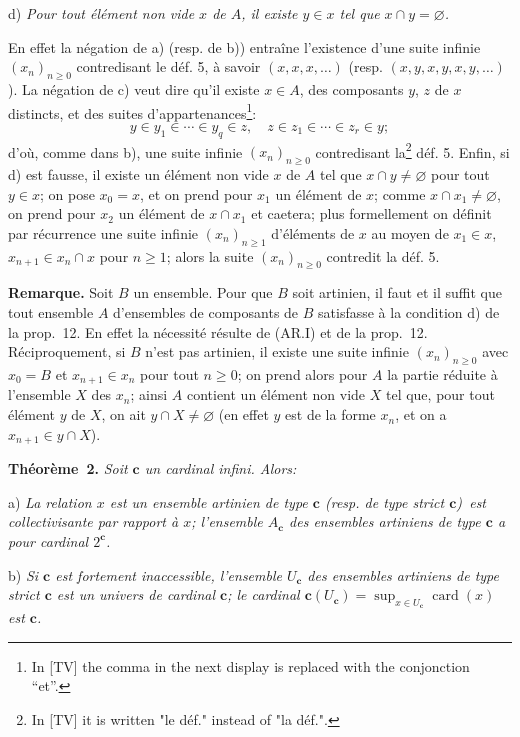 \documentclass[12pt]{article}
\newcommand{\nn}{\noindent}
\newcommand{\card}{\operatorname{card}}
\begin{document}
\nn d) \emph{Pour tout élément non vide $x$ de $A$, il existe $y\in x$ tel que $x\cap y=\varnothing$.}

En effet la négation de a) (resp. de b)) entraîne l'existence d'une suite infinie $(x_n)_{n\geq 0}$ contredisant le déf. 5, à savoir $(x,x,x,\ldots)$ (resp. $(x,y,x,y,x,y,\ldots)$). La négation de c) veut dire qu'il existe $x\in A$, des composants $y$, $z$ de $x$ distincts, et des suites d'appartenances\footnote{In [TV] the comma in the next display is replaced with the conjonction ``et''.}:
$$
y\in y_1\in\cdots\in y_q\in z,\quad z\in z_1\in\cdots\in z_r\in y;
$$
d'où, comme dans b), une suite infinie $(x_n)_{n\geq 0}$ contredisant la\footnote{In [TV] it is written "le déf." instead of "la déf.".} déf. 5. Enfin, si d) est fausse, il existe un élément non vide $x$ de $A$ tel que $x\cap y\neq \varnothing$ pour tout $y\in x$; on pose $x_0=x$, et on prend pour $x_1$ un élément de $x$; comme $x\cap x_1\neq \varnothing$, on prend pour $x_2$ un élément de $x\cap x_1$ et caetera; plus formellement on définit par récurrence une suite infinie $(x_n)_{n\geq 1}$ d'éléments de $x$ au moyen de $x_1\in x$, $x_{n+1}\in x_n\cap x$ pour $n\geq 1$; alors la suite $(x_n)_{n\geq 0}$ contredit la déf. 5.

\nn\textbf{Remarque.} Soit $B$ un ensemble. Pour que $B$ soit artinien, il faut et il suffit que tout ensemble $A$ d'ensembles de composants de $B$ satisfasse à la condition d) de la prop.~12. En effet la nécessité résulte de (AR.I) et de la prop.~12. Réciproquement, si $B$ n'est pas artinien, il existe une suite infinie $(x_n)_{n\geq0}$ avec $x_0=B$ et $x_{n+1}\in x_n$ pour tout $n\geq 0$; on prend alors pour $A$ la partie réduite à l'ensemble $X$ des $x_n$; ainsi $A$ contient un élément non vide $X$ tel que, pour tout élément $y$ de $X$, on ait $y\cap X\neq\varnothing$ (en effet $y$ est de la forme $x_n$, et on a $x_{n+1}\in y\cap X$).

\nn\textbf{Théorème~2.} \emph{Soit $\mathbf c$ un cardinal infini. Alors:}

\nn a) \emph{La relation \og$x$ est un ensemble artinien de type $\mathbf c$ (resp. de type strict $\mathbf c$)\fg\ est collectivisante par rapport à $x$; l'ensemble $A_{\mathbf c}$ des ensembles artiniens de type $\mathbf c$ a pour cardinal $2^{\mathbf c}$.}

\nn b) \emph{Si $\mathbf c$ est fortement inaccessible, l'ensemble $U_{\mathbf c}$ des ensembles artiniens de type strict $\mathbf c$ est un univers de cardinal $\mathbf c$; le cardinal $\mathbf c(U_{\mathbf c})=\sup_{x\in U_{\mathbf c}}\card(x)$ est $\mathbf c$.}
\end{document}
